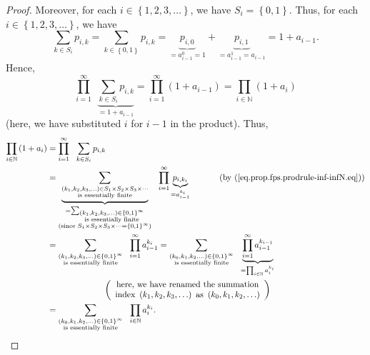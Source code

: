 \begin{proof}
Moreover, for each $i\in\left\{  1,2,3,\ldots\right\}  $, we have
$S_{i}=\left\{  0,1\right\}  $. Thus, for each $i\in\left\{  1,2,3,\ldots
\right\}  $, we have%
\[
\sum_{k\in S_{i}}p_{i,k}=\sum_{k\in\left\{  0,1\right\}  }p_{i,k}%
=\underbrace{p_{i,0}}_{=a_{i-1}^{0}=1}+\underbrace{p_{i,1}}_{=a_{i-1}%
^{1}=a_{i-1}}=1+a_{i-1}.
\]
Hence,%
\[
\prod_{i=1}^{\infty}\ \ \underbrace{\sum_{k\in S_{i}}p_{i,k}}_{=1+a_{i-1}%
}=\prod_{i=1}^{\infty}\left(  1+a_{i-1}\right)  =\prod_{i\in\mathbb{N}}\left(
1+a_{i}\right)
\]
(here, we have substituted $i$ for $i-1$ in the product). Thus,%
\begin{align}
\prod_{i\in\mathbb{N}}\left(  1+a_{i}\right)   &  =\prod_{i=1}^{\infty
}\ \ \sum_{k\in S_{i}}p_{i,k}\nonumber\\
&  =\underbrace{\sum_{\substack{\left(  k_{1},k_{2},k_{3},\ldots\right)  \in
S_{1}\times S_{2}\times S_{3}\times\cdots\\\text{is essentially finite}}%
}}_{\substack{=\sum_{\substack{\left(  k_{1},k_{2},k_{3},\ldots\right)
\in\left\{  0,1\right\}  ^{\infty}\\\text{is essentially finite}%
}}\\\text{(since }S_{1}\times S_{2}\times S_{3}\times\cdots=\left\{
0,1\right\}  ^{\infty}\text{)}}}\ \ \prod_{i=1}^{\infty}\underbrace{p_{i,k_{i}%
}}_{=a_{i-1}^{k_{i}}}\ \ \ \ \ \ \ \ \ \ \left(  \text{by
(\ref{eq.prop.fps.prodrule-inf-infN.eq})}\right) \nonumber\\
&  =\sum_{\substack{\left(  k_{1},k_{2},k_{3},\ldots\right)  \in\left\{
0,1\right\}  ^{\infty}\\\text{is essentially finite}}}\ \ \prod_{i=1}^{\infty
}a_{i-1}^{k_{i}}=\sum_{\substack{\left(  k_{0},k_{1},k_{2},\ldots\right)
\in\left\{  0,1\right\}  ^{\infty}\\\text{is essentially finite}%
}}\ \ \underbrace{\prod_{i=1}^{\infty}a_{i-1}^{k_{i-1}}}_{=\prod
_{i\in\mathbb{N}}a_{i}^{k_{i}}}\nonumber\\
&  \ \ \ \ \ \ \ \ \ \ \ \ \ \ \ \ \ \ \ \ \left(
\begin{array}
[c]{c}%
\text{here, we have renamed the summation}\\
\text{index }\left(  k_{1},k_{2},k_{3},\ldots\right)  \text{ as }\left(
k_{0},k_{1},k_{2},\ldots\right)
\end{array}
\right) \nonumber\\
&  =\sum_{\substack{\left(  k_{0},k_{1},k_{2},\ldots\right)  \in\left\{
0,1\right\}  ^{\infty}\\\text{is essentially finite}}}\ \ \prod_{i\in
\mathbb{N}}a_{i}^{k_{i}}. \label{pf.eq.fps.prod.binary.prod-inf.5}%
\end{align}



\end{proof}
